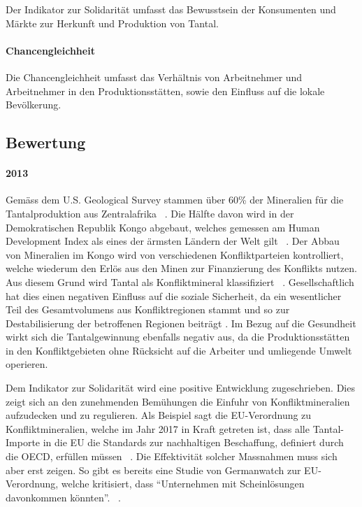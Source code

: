 Der Indikator zur Solidarität umfasst das Bewusstsein der Konsumenten und
Märkte zur Herkunft und Produktion von Tantal.

\paragraph{Chancengleichheit}

Die Chancengleichheit umfasst das Verhältnis von Arbeitnehmer und
Arbeitnehmer in den Produktionsstätten, sowie den Einfluss auf die lokale
Bevölkerung.

\subsection{Bewertung}

\paragraph{2013} Gemäss dem U.S. Geological Survey stammen über 60\% der Mineralien für die
Tantalproduktion aus Zentralafrika ~\cite{USGSMine8}. Die Hälfte davon
wird in der Demokratischen Republik Kongo abgebaut, welches gemessen am Human Development Index als eines der ärmsten
Ländern der Welt gilt ~\cite{UNDProgramme2018}. Der Abbau von Mineralien im
Kongo wird von verschiedenen Konfliktparteien kontrolliert, welche wiederum
den Erlös aus den Minen zur Finanzierung des Konflikts nutzen. Aus diesem Grund
wird Tantal als Konfliktmineral klassifiziert ~\cite{doevenspeck2012konfliktmineralien}.
Gesellschaftlich hat dies einen negativen Einfluss auf die soziale
Sicherheit, da ein wesentlicher Teil des Gesamtvolumens aus Konfliktregionen
stammt und so zur Destabilisierung der betroffenen Regionen beiträgt \cite{Thespoil65}. 
Im Bezug auf die Gesundheit wirkt sich die Tantalgewinnung ebenfalls negativ aus, da die 
Produktionsstätten in den Konfliktgebieten ohne Rücksicht auf die Arbeiter und umliegende Umwelt
operieren.

Dem Indikator zur Solidarität wird eine positive Entwicklung zugeschrieben.
Dies zeigt sich an den zunehmenden Bemühungen die Einfuhr von Konfliktmineralien 
aufzudecken und zu regulieren. Als Beispiel sagt die EU-Verordnung zu Konfliktmineralien, 
welche im Jahr 2017 in Kraft getreten ist, dass alle Tantal-Importe in die EU die Standards zur nachhaltigen Beschaffung, definiert durch die OECD, erfüllen müssen ~\cite{europeancommission}. Die Effektivität solcher 
Massnahmen muss sich aber erst zeigen. So gibt es bereits eine Studie von Germanwatch zur EU-Verordnung, 
welche kritisiert, dass ``Unternehmen mit Scheinlösungen davonkommen könnten''. ~\cite{Governan35}.

